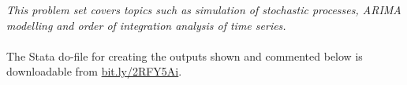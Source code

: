\textit{This problem set covers topics such as simulation of stochastic processes, ARIMA
modelling and order of integration analysis of time series.}
\\ \\
The Stata do-file for creating the outputs shown and commented below is downloadable from \href{https://bit.ly/2RFY5Ai}{bit.ly/2RFY5Ai}.
